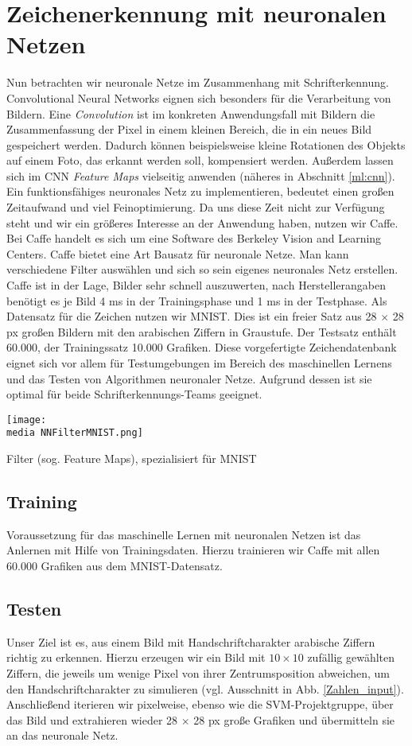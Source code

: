 \section{Zeichenerkennung mit neuronalen Netzen}
Nun betrachten wir neuronale Netze im Zusammenhang mit Schrifterkennung. Convolutional Neural Networks eignen sich besonders für die Verarbeitung von Bildern. Eine \emph{Convolution} ist im konkreten Anwendungsfall mit Bildern die Zusammenfassung der Pixel in einem kleinen Bereich, die in ein neues Bild gespeichert werden. Dadurch können beispielsweise kleine Rotationen des Objekts auf einem Foto, das erkannt werden soll, kompensiert werden. Außerdem lassen sich im CNN \emph{Feature Maps} vielseitig anwenden (näheres in Abschnitt \ref{ml:cnn}).
Ein funktionsfähiges neuronales Netz zu implementieren, bedeutet einen großen Zeitaufwand und viel Feinoptimierung. Da uns diese Zeit nicht zur Verfügung steht und wir ein größeres Interesse an der Anwendung haben, nutzen wir Caffe. Bei Caffe handelt es sich um eine Software des Berkeley Vision and Learning Centers. Caffe bietet eine Art Bausatz für neuronale Netze. Man kann verschiedene Filter auswählen und sich so sein eigenes neuronales Netz erstellen. Caffe ist in der Lage, Bilder sehr schnell auszuwerten, nach Herstellerangaben benötigt es je Bild 4 ms in der Trainingsphase und 1 ms in der Testphase.
Als Datensatz für die Zeichen nutzen wir MNIST. Dies ist ein freier Satz aus 28 $\times$ 28 px großen Bildern mit den arabischen Ziffern in Graustufe. Der Testsatz enthält 60.000, der Trainingssatz 10.000 Grafiken. Diese vorgefertigte Zeichendatenbank eignet sich vor allem für Testumgebungen im Bereich des maschinellen Lernens und das Testen von Algorithmen neuronaler Netze. Aufgrund dessen ist sie optimal für beide Schrifterkennungs-Teams geeignet.
\begin{dsafigure}
\begin{center}
	\texttt{[image: \\media NNFilterMNIST.png]}
	\caption{Filter (sog. Feature Maps), spezialisiert für MNIST}
	\label{NNFilterMNIST}
\end{center}
\end{dsafigure}

\subsection{Training}
Voraussetzung für das maschinelle Lernen mit neuronalen Netzen ist das Anlernen mit Hilfe von Trainingsdaten. Hierzu trainieren wir Caffe mit allen 60.000 Grafiken aus dem MNIST-Datensatz.

\subsection{Testen}
Unser Ziel ist es, aus einem Bild mit Handschriftcharakter arabische Ziffern richtig zu erkennen. Hierzu erzeugen wir ein Bild mit $10 \times 10$ zufällig gewählten Ziffern, die jeweils um wenige Pixel von ihrer Zentrumsposition abweichen, um den Handschriftcharakter zu simulieren (vgl. Ausschnitt in Abb. \ref{Zahlen_input}). Anschließend iterieren wir pixelweise, ebenso wie die SVM-Projektgruppe, über das Bild und extrahieren wieder 28 $\times$ 28 px große Grafiken und übermitteln sie an das neuronale Netz.
